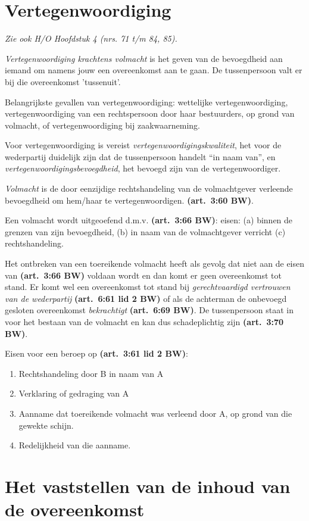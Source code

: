 \documentclass[a4paper]{article}
\newcommand{\art}[1]{\textbf{(art.~#1 BW)}\xspace}
\begin{document}
\section{Vertegenwoordiging} \label{sec:vertegenwoordiging}

\emph{Zie ook H/O Hoofdstuk 4 (nrs. 71 t/m 84, 85).}

\emph{Vertegenwoordiging krachtens volmacht} is het geven van de bevoegdheid
aan iemand om namens jouw een overeenkomst aan te gaan. De tussenpersoon valt
er bij die overeenkomst 'tussenuit'.

Belangrijkste gevallen van vertegenwoordiging: wettelijke vertegenwoordiging,
vertegenwoordiging van een rechtspersoon door haar bestuurders, op grond van
volmacht, of vertegenwoordiging bij zaakwaarneming.

Voor vertegenwoordiging is vereist \emph{vertegenwoordigingskwaliteit}, het
voor de wederpartij duidelijk zijn dat de tussenpersoon handelt ``in naam
van'', en \emph{vertegenwoordigingsbevoegdheid}, het bevoegd zijn van de
vertegenwoordiger.

\emph{Volmacht} is de door eenzijdige rechtshandeling van de volmachtgever
verleende bevoegdheid om hem/haar te vertegenwoordigen. \art{3:60}.

Een volmacht wordt uitgeoefend d.m.v. \art{3:66}: eisen: (a) binnen de grenzen
van zijn bevoegdheid, (b) in naam van de volmachtgever verricht (c)
rechtshandeling.

Het ontbreken van een toereikende volmacht heeft als gevolg dat niet aan de
eisen van \art{3:66} voldaan wordt en dan komt er geen overeenkomst tot stand.
Er komt wel een overeenkomst tot stand bij \emph{gerechtvaardigd vertrouwen
van de wederpartij} \art{6:61 lid 2} of als de achterman de onbevoegd gesloten
overeenkomst \emph{bekrachtigt} \art{6:69}. De tussenpersoon staat in voor het
bestaan van de volmacht en kan dus schadeplichtig zijn \art{3:70}.

Eisen voor een beroep op \art{3:61 lid 2}:
\begin{enumerate}
  \item Rechtshandeling door B in naam van A
  \item Verklaring of gedraging van A
  \item Aanname dat toereikende volmacht was verleend door A, op grond van die
    gewekte schijn.
  \item Redelijkheid van die aanname.
\end{enumerate}

\section{Het vaststellen van de inhoud van de overeenkomst}
\end{document}
